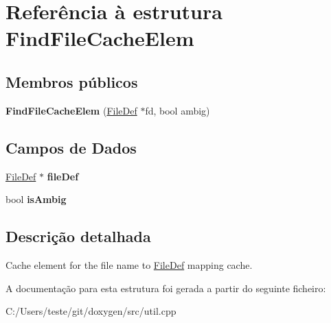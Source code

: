 \hypertarget{struct_find_file_cache_elem}{\section{Referência à estrutura Find\-File\-Cache\-Elem}
\label{struct_find_file_cache_elem}
}
\subsection*{Membros públicos}
\begin{DoxyCompactItemize}
\item 
\hypertarget{struct_find_file_cache_elem_adb524cbb91be9a488863f9833436cc6c}{{\bfseries Find\-File\-Cache\-Elem} (\hyperlink{class_file_def}{File\-Def} $\ast$fd, bool ambig)}\label{struct_find_file_cache_elem_adb524cbb91be9a488863f9833436cc6c}

\end{DoxyCompactItemize}
\subsection*{Campos de Dados}
\begin{DoxyCompactItemize}
\item 
\hypertarget{struct_find_file_cache_elem_a2e1ae363ea84baa4340319bb5a163f25}{\hyperlink{class_file_def}{File\-Def} $\ast$ {\bfseries file\-Def}}\label{struct_find_file_cache_elem_a2e1ae363ea84baa4340319bb5a163f25}

\item 
\hypertarget{struct_find_file_cache_elem_afb9935acf7f4e4f66770204ab6e8e556}{bool {\bfseries is\-Ambig}}\label{struct_find_file_cache_elem_afb9935acf7f4e4f66770204ab6e8e556}

\end{DoxyCompactItemize}


\subsection{Descrição detalhada}
Cache element for the file name to \hyperlink{class_file_def}{File\-Def} mapping cache. 

A documentação para esta estrutura foi gerada a partir do seguinte ficheiro\-:\begin{DoxyCompactItemize}
\item 
C\-:/\-Users/teste/git/doxygen/src/util.\-cpp\end{DoxyCompactItemize}
